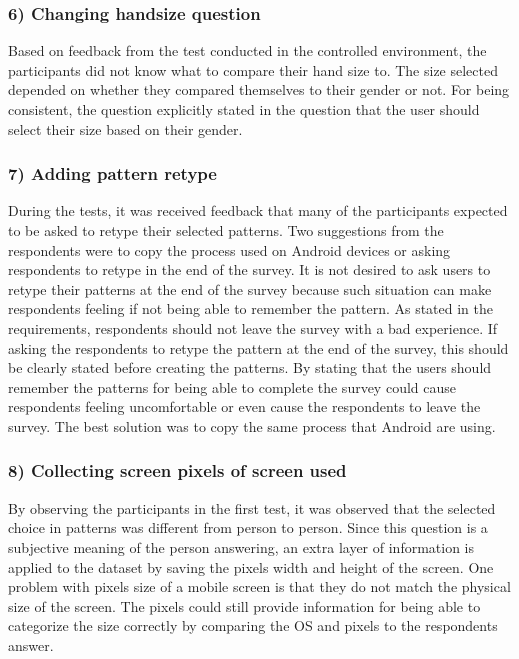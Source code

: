     \subsubsection*{6) Changing handsize question}
    Based on feedback from the test conducted in the controlled environment, the participants did not know what to compare their hand size to. The size selected depended on whether they compared themselves to their gender or not. For being consistent, the question explicitly stated in the question that the user should select their size based on their gender. 

    \subsubsection*{7) Adding pattern retype}
    During the tests, it was received feedback that many of the participants expected to be asked to retype their selected patterns. Two suggestions from the respondents were to copy the process used on Android devices or asking respondents to retype in the end of the survey. It is not desired to ask users to retype their patterns at the end of the survey because such situation can make respondents feeling if not being able to remember the pattern. As stated in the requirements, respondents should not leave the survey with a bad experience. If asking the respondents to retype the pattern at the end of the survey, this should be clearly stated before creating the patterns. By stating that the users should remember the patterns for being able to complete the survey could cause respondents feeling uncomfortable or even cause the respondents to leave the survey. The best solution was to copy the same process that Android are using.

    \subsubsection*{8) Collecting screen pixels of screen used}
    By observing the participants in the first test, it was observed that the selected choice in patterns was different from person to person. Since this question is a subjective meaning of the person answering, an extra layer of information is applied to the dataset by saving the pixels width and height of the screen. One problem with pixels size of a mobile screen is that they do not match the physical size of the screen. The pixels could still provide information for being able to categorize the size correctly by comparing the OS and pixels to the respondents answer.

